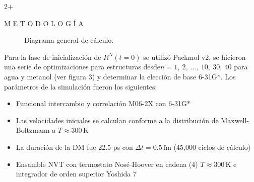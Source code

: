 \documentclass[final]{beamer}
\newlength{\sepwidth}
\newlength{\colwidth}
\begin{document}
\begin{frame}[t]
\begin{columns}[t]
\begin{column}{2\colwidth+\sepwidth}
\begin{exampleblock}{M E T O D O L O G Í A}{}
\begin{figure}[H]
					\caption{Diagrama general de cálculo.}
					\label{fig:metodologia}
				\end{figure}

				Para la fase de inicialización de $R^{N}(t=0)$ se utilizó Packmol v2, se hicieron una serie de optimizaciones para estructuras desde$n = 1,\ 2,\ \ldots,\ 10,\ 30,\ 40$ para agua y metanol (ver figura 3) y determinar la elección de base 6-31G*. Los parámetros de la simulación fueron los siguientes:

				\begin{itemize}
					\item Funcional intercambio y correlación M06-2X con 6-31G*
					\item Las velocidades iniciales se calculan conforme a la distribución de Maxwell-Boltzmann a $T \approx 300\,\text{K}$
					\item La duración de la DM fue 22.5 ps con $\Delta t = 0.5\,\text{fm}$ (45,000 ciclos de cálculo)
					\item Ensamble NVT con termostato Nosé-Hoover en cadena (4) $T \approx 300\,\text{K}$ e integrador de orden superior Yoshida 7
				\end{itemize}


\end{exampleblock}
\end{column}
\end{columns}
\end{frame}
\end{document}
